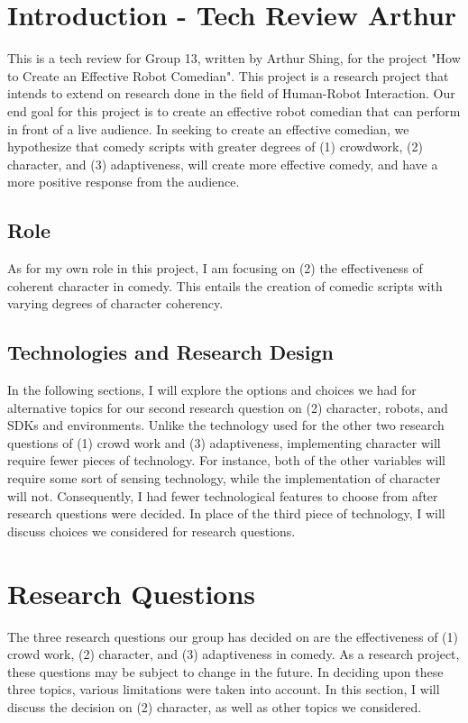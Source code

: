 \section{Introduction - Tech Review Arthur}

This is a tech review for Group 13, written by Arthur Shing, for the project "How to Create an Effective Robot Comedian".
This project is a research project that intends to extend on research done in the field of Human-Robot Interaction.
Our end goal for this project is to create an effective robot comedian that can perform in front of a live audience.
In seeking to create an effective comedian, we hypothesize that comedy scripts with greater degrees of (1) crowdwork, (2) character, and (3) adaptiveness, will create more effective comedy, and have a more positive response from the audience.

\subsection{Role}
As for my own role in this project, I am focusing on (2) the effectiveness of coherent character in comedy.
This entails the creation of comedic scripts with varying degrees of character coherency.

\subsection{Technologies and Research Design}
In the following sections, I will explore the options and choices we had for alternative topics for our second research question on (2) character, robots, and SDKs and environments. Unlike the technology used for the other two research questions of (1) crowd work and (3) adaptiveness, implementing character will require fewer pieces of technology. For instance, both of the other variables will require some sort of sensing technology, while the implementation of character will not. Consequently, I had fewer technological features to choose from after research questions were decided. In place of the third piece of technology, I will discuss choices we considered for research questions.


\section{Research Questions}
The three research questions our group has decided on are the effectiveness of (1) crowd work, (2) character, and (3) adaptiveness in comedy. As a research project, these questions may be subject to change in the future. In deciding upon these three topics, various limitations were taken into account. In this section, I will discuss the decision on (2) character, as well as other topics we considered.

